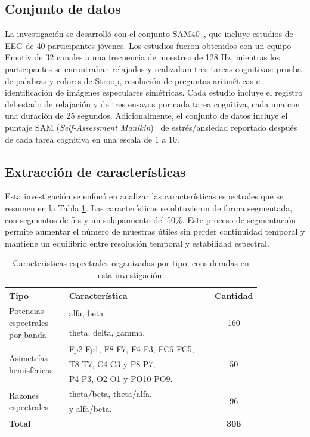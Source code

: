 \documentclass[runningheads]{llncs}
\begin{document}
\subsection{Conjunto de datos}
La investigación se desarrolló con el conjunto SAM40~\cite{SAM40Figshare2021}, que incluye estudios de EEG de 40 participantes jóvenes. Los estudios fueron obtenidos con un equipo Emotiv de 32 canales a una frecuencia de muestreo de 128 Hz, mientras los participantes se encontraban relajados y realizaban tres tareas cognitivas: prueba de palabras y colores de Stroop, resolución de preguntas aritméticas e identificación de imágenes especulares simétricas. Cada estudio incluye el registro del estado de relajación y de tres ensayos por cada tarea cognitiva, cada una con una duración de 25 segundos.
Adicionalmente, el conjunto de datos incluye el puntaje SAM (\textit{Self-Assessment Manikin})~\cite{Bradley1994} de estrés/ansiedad reportado después de cada tarea cognitiva en una escala de 1 a 10.

\subsection{Extracción de características}
Esta investigación se enfocó en analizar las características espectrales que se resumen en la Tabla \ref{tab:resumen_caracteristicas}.
Las características se obtuvieron de forma segmentada, con segmentos de 5 s y un solapamiento del 50\%. Este proceso de segmentación permite aumentar el número de muestras útiles sin perder continuidad temporal y mantiene un equilibrio entre resolución temporal y estabilidad espectral.

\begin{table}[!htbp]
\centering
\caption{Características espectrales organizadas por tipo, consideradas en esta investigación.}
\label{tab:resumen_caracteristicas}
\small
{\renewcommand{\arraystretch}{1.25}
\begin{tabular}{p{0.24\linewidth} p{0.6\linewidth} c}
\hline
Tipo & Característica & Cantidad \\
\hline
\multirow{2}{=}{Potencias espectrales por banda} & alfa, beta & \multirow{2}{*}{160} \\
& theta, delta, gamma. & \\
\multirow{3}{=}{Asimetrías hemisféricas} & Fp2-Fp1, F8-F7, F4-F3, FC6-FC5, & \multirow{3}{*}{50} \\
& T8-T7, C4-C3 y P8-P7, & \\
& P4-P3, O2-O1 y PO10-PO9. & \\
\multirow{2}{=}{Razones espectrales} & theta/beta, theta/alfa. & \multirow{2}{*}{96} \\
& y alfa/beta. & \\
\hline
\textbf{Total} & & \textbf{306} \\
\hline
\end{tabular}
}
\end{table}
\end{document}

